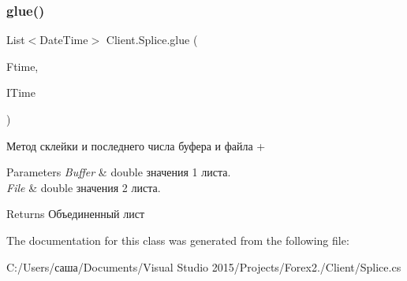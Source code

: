 \subsubsection{\texorpdfstring{glue()}{glue()}\hspace{0.1cm}{\footnotesize\ttfamily [4/4]}}
{\footnotesize\ttfamily List$<$Date\+Time$>$ Client.\+Splice.\+glue (\begin{DoxyParamCaption}\item[{List$<$ Date\+Time $>$}]{Ftime,  }\item[{List$<$ Date\+Time $>$}]{I\+Time }\end{DoxyParamCaption})\hspace{0.3cm}{\ttfamily [inline]}}



Метод склейки и последнего числа буфера и файла + 


\begin{DoxyParams}{Parameters}
{\em Buffer} & double значения 1 листа.\\
\hline
{\em File} & double значения 2 листа.\\
\hline
\end{DoxyParams}
\begin{DoxyReturn}{Returns}
Объединенный лист
\end{DoxyReturn}


The documentation for this class was generated from the following file\+:\begin{DoxyCompactItemize}
\item 
C\+:/\+Users/саша/\+Documents/\+Visual Studio 2015/\+Projects/\+Forex2./\+Client/Splice.\+cs\end{DoxyCompactItemize}
